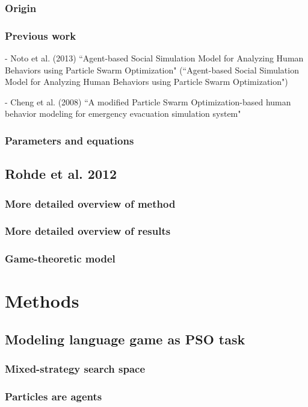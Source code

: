 \documentclass[12pt]{article}
\begin{document}
\subsubsection{Origin}
\subsubsection{Previous work}
- Noto et al. (2013) ``Agent-based Social Simulation Model for Analyzing Human Behaviors using Particle Swarm Optimization" (``Agent-based Social Simulation Model for Analyzing Human Behaviors using Particle Swarm Optimization")

- Cheng et al. (2008) ``A modified Particle Swarm Optimization-based human behavior modeling for emergency evacuation simulation system"
\subsubsection{Parameters and equations}

\subsection{Rohde et al. 2012}
\subsubsection{More detailed overview of method}
\subsubsection{More detailed overview of results}
\subsubsection{Game-theoretic model}


\section{Methods}
\subsection{Modeling language game as PSO task}
\subsubsection{Mixed-strategy search space}
\subsubsection{Particles are agents}
\end{document}
